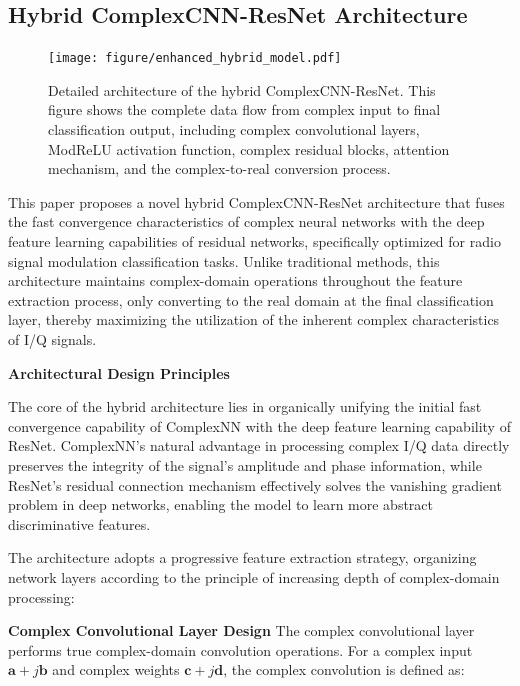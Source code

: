 \documentclass[conference]{IEEEtran}
\begin{document}
\subsection{Hybrid ComplexCNN-ResNet Architecture}

\begin{figure}[htbp]
\centering
\texttt{[image: figure/enhanced\_hybrid\_model.pdf]}
\caption{Detailed architecture of the hybrid ComplexCNN-ResNet. This figure shows the complete data flow from complex input to final classification output, including complex convolutional layers, ModReLU activation function, complex residual blocks, attention mechanism, and the complex-to-real conversion process.}
\label{fig:enhanced_hybrid_model}
\end{figure}




This paper proposes a novel hybrid ComplexCNN-ResNet architecture that fuses the fast convergence characteristics of complex neural networks with the deep feature learning capabilities of residual networks, specifically optimized for radio signal modulation classification tasks. Unlike traditional methods, this architecture maintains complex-domain operations throughout the feature extraction process, only converting to the real domain at the final classification layer, thereby maximizing the utilization of the inherent complex characteristics of I/Q signals.



\textbf{Architectural Design Principles}

The core of the hybrid architecture lies in organically unifying the initial fast convergence capability of ComplexNN with the deep feature learning capability of ResNet. ComplexNN's natural advantage in processing complex I/Q data directly preserves the integrity of the signal's amplitude and phase information, while ResNet's residual connection mechanism effectively solves the vanishing gradient problem in deep networks, enabling the model to learn more abstract discriminative features.

The architecture adopts a progressive feature extraction strategy, organizing network layers according to the principle of increasing depth of complex-domain processing:

\textbf{Complex Convolutional Layer Design} The complex convolutional layer performs true complex-domain convolution operations. For a complex input $\mathbf{a} + j\mathbf{b}$ and complex weights $\mathbf{c} + j\mathbf{d}$, the complex convolution is defined as:
\end{document}
